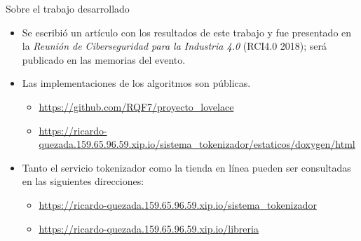 \begin{frame}{Sobre el trabajo desarrollado}
  \begin{itemize}
    \item Se escribió un artículo con los resultados de este trabajo y fue
      presentado en la \textit{Reunión de Ciberseguridad para la Industria 4.0}
      (RCI4.0 2018); será publicado en las memorias del evento.
    \item Las implementaciones de los algoritmos son públicas.
      \begin{itemize}
        \item \url{https://github.com/RQF7/proyecto_lovelace}
        \item \url{https://ricardo-quezada.159.65.96.59.xip.io/sistema_tokenizador/estaticos/doxygen/html}
      \end{itemize}
    \item Tanto el servicio tokenizador como la tienda en línea pueden ser
      consultadas en las siguientes direcciones:
      \begin{itemize}
        \item \url{https://ricardo-quezada.159.65.96.59.xip.io/sistema_tokenizador}
        \item \url{https://ricardo-quezada.159.65.96.59.xip.io/libreria}
      \end{itemize}
  \end{itemize}
\end{frame}
